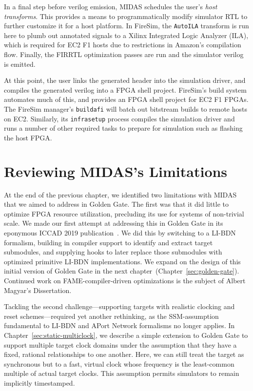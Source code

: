 In a final step before verilog emission, MIDAS schedules the user's
\emph{host transforms}.  This provides a means to programmatically modify simulator RTL to further
customize it for a host platform. In FireSim, the \texttt{AutoILA}
transform is run here to plumb out annotated signals to a Xilinx Integrated
Logic Analyzer (ILA), which is required for EC2 F1 hosts due to
restrictions in Amazon's compilation flow. Finally, the FIRRTL optimization passes are run
and the simulator verilog is emitted.

At this point, the user links the generated header into the simulation
driver, and compiles the generated verilog into a FPGA shell project.
FireSim's build system automates much of this, and provides an FPGA shell
project for EC2 F1 FPGAs. The FireSim manager's \texttt{buildafi} will batch
out bitstream builds to remote hosts on EC2. Similarly, its
\texttt{infrasetup} process compiles the simulation driver and runs a number of
other required tasks to prepare for simulation such as flashing the host FPGA.

\section{Reviewing MIDAS's Limitations}

At the end of the previous chapter, we identified two limitations with MIDAS
that we aimed to address in Golden Gate. The first was that it did little to
optimize FPGA resource utilization, precluding its use for systems of
non-trivial scale. We made our first attempt at addressing this in Golden Gate
in its eponymous ICCAD 2019 publication~\cite{GoldenGate}. We did this by
switching to a LI-BDN formalism, building in compiler support to identify and
extract target submodules, and supplying hooks to later replace those
submodules with optimized primitive LI-BDN implementations. We expand on the
design of this initial version of Golden Gate in the next
chapter~(Chapter~\ref{sec:golden-gate}). Continued work on FAME-compiler-driven
optimizations is the subject of Albert Magyar's Dissertation.

Tackling the second challenge---supporting targets
with realistic clocking and reset schemes---required yet another
rethinking, as the SSM-assumption fundamental to LI-BDN and APort Network
formalisms no longer applies. In Chapter~\ref{sec:static-multiclock}, we
describe a simple extension to Golden Gate to support multiple target clock
domains under the assumption that they have a fixed, rational relationships to one another.
Here, we can still treat the target as synchronous but to a
fast, virtual clock whose frequency is the least-common multiple
of actual target clocks. This assumption permits simulators to remain implicitly
timestamped.


